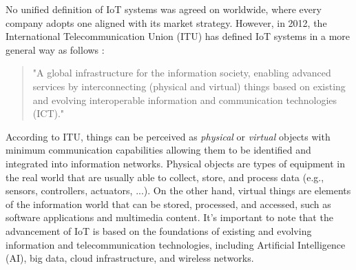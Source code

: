 \documentclass[]{IEEEtran}
\begin{document}

No unified definition of IoT systems was agreed on worldwide, where every company adopts one aligned with its market strategy.
However, in 2012, the International Telecommunication Union (ITU) has defined IoT systems in a more general way as follows \cite{itu-t_overview_2012_Y.2060}:
\begin{quote}
"A global infrastructure for the information society, enabling advanced services by interconnecting (physical and virtual) things based on existing and evolving interoperable information and communication technologies (ICT)."
\end{quote}
According to ITU, things can be perceived as \textit{physical} or \textit{virtual} objects with minimum communication capabilities allowing them to be identified and integrated into information networks. Physical objects are types of equipment in the real world that are usually able to collect, store, and process data (e.g., sensors, controllers, actuators, ...). On the other hand, virtual things are elements of the information world that can be stored, processed, and accessed, such as software applications and multimedia content. It's important to note that the advancement of IoT is based on the foundations of existing and evolving information and telecommunication technologies, including Artificial Intelligence (AI), big data, cloud infrastructure, and wireless networks.
\end{document}

